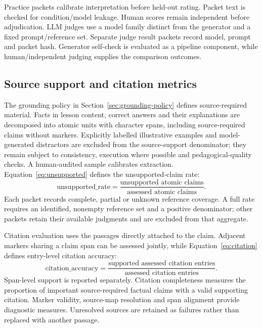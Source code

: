 Practice packets calibrate interpretation before held-out rating. Packet text is checked for condition/model leakage. Human scores remain independent before adjudication. LLM judges use a model family distinct from the generator and a fixed prompt/reference set\citep{selfpreference}. Separate judge result packets record model, prompt and packet hash. Generator self-check is evaluated as a pipeline component, while human/independent judging supplies the comparison outcomes.
\subsection{Source support and citation metrics}
The grounding policy in Section~\ref{sec:grounding-policy} defines source-required material. Facts in lesson content, correct answers and their explanations are decomposed into atomic units with character spans, including source-required claims without markers. Explicitly labelled illustrative examples and model-generated distractors are excluded from the source-support denominator; they remain subject to consistency, execution where possible and pedagogical-quality checks. A human-audited sample calibrates extraction\citep{factscore}. Equation~\ref{eq:unsupported} defines the unsupported-claim rate:
\begin{equation}\label{eq:unsupported}
\mathrm{unsupported\_rate}=\frac{\text{unsupported atomic claims}}{\text{assessed atomic claims}}.
\end{equation}
Each packet records complete, partial or unknown reference coverage. A full rate requires an identified, nonempty reference set and a positive denominator; other packets retain their available judgments and are excluded from that aggregate.

Citation evaluation uses the passages directly attached to the claim\citep{alce}. Adjacent markers sharing a claim span can be assessed jointly, while Equation~\ref{eq:citation} defines entry-level citation accuracy:
\begin{equation}\label{eq:citation}
\mathrm{citation\_accuracy}=\frac{\text{supported assessed citation entries}}{\text{assessed citation entries}}.
\end{equation}
Span-level support is reported separately. Citation completeness measures the proportion of important source-required factual claims with a valid supporting citation. Marker validity, source-map resolution and span alignment provide diagnostic measures. Unresolved sources are retained as failures rather than replaced with another passage.
